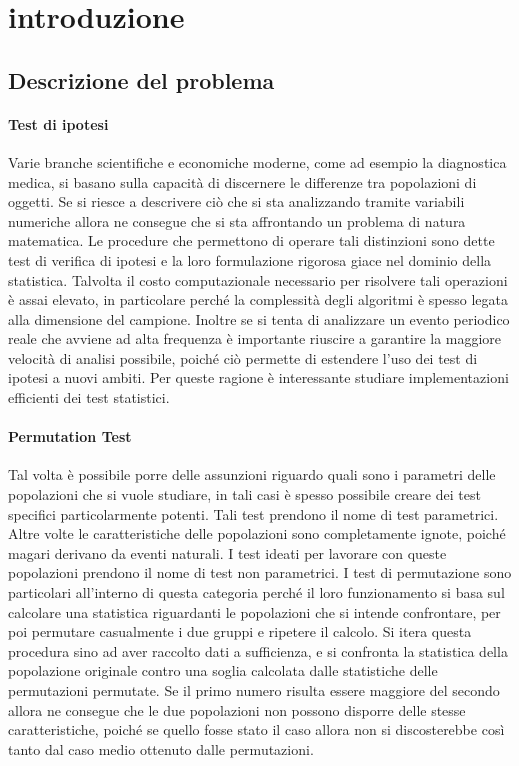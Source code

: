 \section{introduzione}


\subsection{Descrizione del problema}
\paragraph{Test di ipotesi}
Varie branche scientifiche e economiche moderne, come ad esempio la diagnostica medica, si basano sulla capacità di discernere le differenze tra popolazioni di oggetti. Se si riesce a descrivere ciò che si sta analizzando tramite variabili numeriche allora ne consegue che si sta affrontando un problema di natura matematica.
Le procedure che permettono di operare tali distinzioni sono dette test di verifica di ipotesi e la loro formulazione rigorosa giace nel dominio della statistica.
Talvolta il costo computazionale necessario per risolvere tali operazioni è assai elevato, in particolare perché la complessità degli algoritmi è spesso legata alla dimensione del campione. Inoltre se si tenta di analizzare un evento periodico reale che avviene ad alta frequenza è importante riuscire a garantire la maggiore velocità di analisi possibile, poiché ciò permette di estendere l'uso dei test di ipotesi a nuovi ambiti.
Per queste ragione è interessante studiare implementazioni efficienti dei test statistici.

\paragraph{Permutation Test}
Tal volta è possibile porre delle assunzioni riguardo quali sono i parametri delle popolazioni che si vuole studiare, in tali casi è spesso possibile creare dei test specifici particolarmente potenti. Tali test prendono il nome di test parametrici.
Altre volte le caratteristiche delle popolazioni sono completamente ignote, poiché magari derivano da eventi naturali. I test ideati per lavorare con queste popolazioni prendono il nome di test non parametrici. 
I test di permutazione sono particolari all'interno di questa categoria perché il loro funzionamento si basa sul calcolare una statistica riguardanti le popolazioni che si intende confrontare, per poi permutare casualmente i due gruppi e ripetere il calcolo. Si itera questa procedura sino ad aver raccolto dati a sufficienza, e si confronta la statistica della popolazione originale contro una soglia calcolata dalle statistiche delle permutazioni permutate. Se il primo numero risulta essere maggiore del secondo allora ne consegue che le due popolazioni non possono disporre delle stesse caratteristiche, poiché se quello fosse stato il caso allora non si discosterebbe così tanto dal caso medio ottenuto dalle permutazioni.

